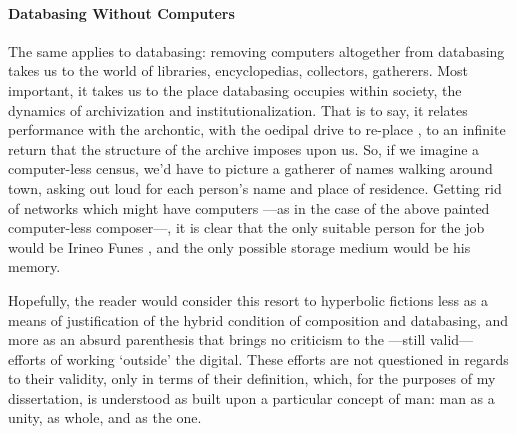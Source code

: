\paragraph{Databasing Without Computers}
The same applies to databasing: removing computers altogether from databasing takes us to the world of libraries, encyclopedias, collectors, gatherers. Most important, it takes us to the place databasing occupies within society, the dynamics of archivization and institutionalization. That is to say, it relates performance with the archontic, with the oedipal drive to re-place , to an infinite return that the structure of the archive imposes upon us. So, if we imagine a computer-less census, we'd have to picture a gatherer of names walking around town, asking out loud for each person's name and place of residence. Getting rid of networks which might have computers ---as in the case of the above painted computer-less composer---, it is clear that the only suitable person for the job would be Irineo Funes , and the only possible storage medium would be his memory. 

Hopefully, the reader would consider this resort to hyperbolic fictions less as a means of justification of the hybrid condition of composition and databasing, and more as an absurd parenthesis that brings no criticism to the ---still valid--- efforts of working `outside' the digital. These efforts are not questioned in regards to their validity, only in terms of their definition, which, for the purposes of my dissertation, is understood as built upon a particular concept of man: man as a unity, as whole, and as the one.